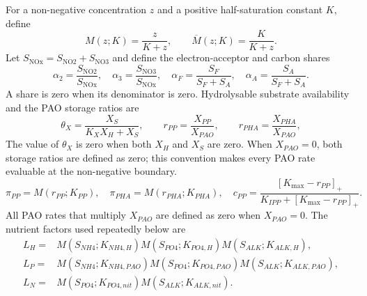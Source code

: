 \documentclass[a4paper,fleqn]{cas-sc}
\begin{document}
For a non-negative concentration $z$ and a positive half-saturation constant $K$, define
\begin{equation}
M(z;K)=\frac{z}{K+z},\qquad \overline M(z;K)=\frac{K}{K+z}.
\end{equation}
Let $S_{\mathrm{NOx}}=S_{\mathrm{NO2}}+S_{\mathrm{NO3}}$ and define the electron-acceptor and carbon shares
\begin{equation}
\alpha_2=\frac{S_{\mathrm{NO2}}}{S_{\mathrm{NOx}}},\quad
\alpha_3=\frac{S_{\mathrm{NO3}}}{S_{\mathrm{NOx}}},\quad
\alpha_F=\frac{S_F}{S_F+S_A},\quad
\alpha_A=\frac{S_A}{S_F+S_A}.
\end{equation}
A share is zero when its denominator is zero. Hydrolysable substrate availability and the PAO storage ratios are
\begin{equation}
\theta_X=\frac{X_S}{K_XX_H+X_S},\qquad
r_{PP}=\frac{X_{PP}}{X_{PAO}},\qquad
r_{PHA}=\frac{X_{PHA}}{X_{PAO}},
\end{equation}
The value of $\theta_X$ is zero when both $X_H$ and $X_S$ are zero. When $X_{PAO}=0$, both storage ratios are defined as zero; this convention makes every PAO rate evaluable at the non-negative boundary.
\begin{equation}
\pi_{PP}=M(r_{PP};K_{PP}),\quad
\pi_{PHA}=M(r_{PHA};K_{PHA}),\quad
c_{PP}=\frac{[K_{\max}-r_{PP}]_+}{K_{IPP}+[K_{\max}-r_{PP}]_+}.
\end{equation}
All PAO rates that multiply $X_{PAO}$ are defined as zero when $X_{PAO}=0$. The nutrient factors used repeatedly below are
\begin{align}
L_H={}&M(S_{NH4};K_{NH4,H})M(S_{PO4};K_{PO4,H})M(S_{ALK};K_{ALK,H}),\\
L_P={}&M(S_{NH4};K_{NH4,PAO})M(S_{PO4};K_{PO4,PAO})M(S_{ALK};K_{ALK,PAO}),\\
L_N={}&M(S_{PO4};K_{PO4,nit})M(S_{ALK};K_{ALK,nit}).
\end{align}
\end{document}
